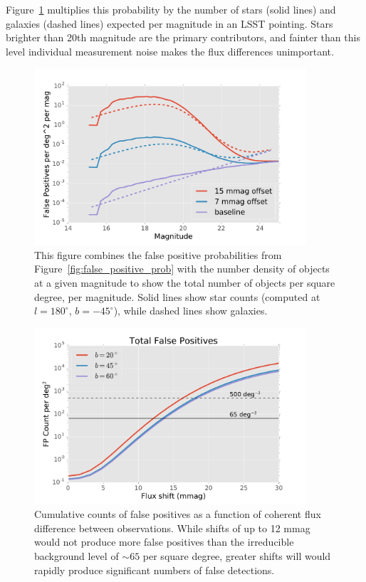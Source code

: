 \documentclass[DM]{lsstdoc}
\begin{document}
Figure~\ref{fig:false_positive_differential} multiplies this probability by the
number of stars (solid lines) and galaxies (dashed lines) expected per magnitude
in an LSST pointing. Stars brighter than 20th magnitude are the primary
contributors, and fainter than this level individual measurement noise makes the
flux differences unimportant.

\begin{figure}
\includegraphics[width=0.9\textwidth]{figures/false_positive_differential.pdf}
\caption{This figure combines the false positive probabilities from
Figure~\ref{fig:false_positive_prob} with the number density of objects at a
given magnitude to show the total number of objects per square degree, per magnitude.
Solid lines show star counts (computed at $l=180^\circ$, $b=-45^\circ$), while
dashed lines show galaxies.
\label{fig:false_positive_differential}}
\end{figure}

\begin{figure}
\includegraphics[width=0.9\textwidth]{figures/fp_vs_flux_shift.pdf}
\caption{Cumulative counts of false positives as a function of coherent flux
difference between observations. While shifts of up to 12 mmag would not produce
more false positives than the irreducible background level of $\sim 65$ per
square degree, greater shifts will would rapidly produce significant numbers of
false detections.
\label{fig:fp_vs_flux_shift}}
\end{figure}
\end{document}

